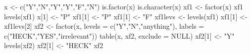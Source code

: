 \begin{Schunk}
\begin{Sinput}
  x <- c("Y","N","Y","Y","F","N")
  is.factor(x)
  is.character(x)
  xf1 <- factor(x)
  xf1
  levels(xf1)
  x[1] <- "P"
  xf1[1] <- "P"
  xf1[1] <- "F"
  xf1levs <- levels(xf1)
  xf1[1] <-  xf1levs[2]
  xf2 <- factor(x, levels = c("Y","N","anything"), labels  = c("HECK","YES","irrelevant"))
  table(x, xf2, exclude = NULL)
  xf2[1] <- "Y"
  levels(xf2)
  xf2[1] <- "HECK"
  xf2
\end{Sinput}
\end{Schunk}
